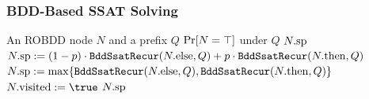 \begin{frame}
  \frametitle{BDD-Based SSAT Solving}
  {
    \small
    \begin{algorithmic}[1]
      \REQUIRE An ROBDD node $N$ and a prefix $Q$
      \ENSURE $\Pr[N=\top]$ under $Q$
      \label{code:bddssat-recursive-constant-start}
      \RETURN $N.\mathrm{sp}$\label{code:bddssat-recursive-constant-end}
      \ENDIF
      \alert{\STATE $N.\mathrm{sp}:=(1-p)\cdot\texttt{BddSsatRecur}(N.\mathrm{else},Q)+p\cdot\texttt{BddSsatRecur}(N.\mathrm{then},Q)$}
      \label{code:bddssat-recursive-random}
      \ELSE
      \alert{\STATE $N.\mathrm{sp}:=\max\{\texttt{BddSsatRecur}(N.\mathrm{else},Q),\texttt{BddSsatRecur}(N.\mathrm{then},Q)\}$}
      \label{code:bddssat-recursive-exist}
      \ENDIF
      \STATE $\nodevisit{N} := \true$
      \ENDIF
      \RETURN $N.\mathrm{sp}$
    \end{algorithmic}
  }
\end{frame}